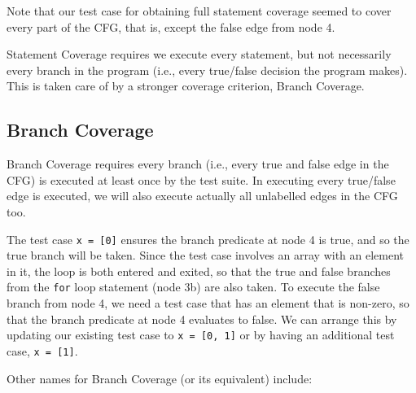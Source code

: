 
Note that our test case for obtaining full statement coverage seemed to cover
every part of the CFG, that is, except the false edge from node 4. 


Statement Coverage requires we execute every statement, but not necessarily
every branch in the program (i.e., every true/false decision the program makes).
This is taken care of by a stronger coverage criterion, Branch Coverage.


\subsection{Branch Coverage} 

Branch Coverage requires every branch (i.e., every true and false edge in the
CFG) is executed at least once by the test suite. In executing every true/false
edge is executed, we will also execute actually all unlabelled edges in the CFG
too.

The test case {\tt x = [0]} ensures the branch predicate at node 4 is true, and
so the true branch will be taken. Since the test case involves an array with an
element in it, the loop is both entered and exited, so that the true and false
branches from the {\tt for} loop statement (node 3b) are also taken. To execute
the false branch from node 4, we need a test case that has an element that is
non-zero, so that the branch predicate at node 4 evaluates to false. We can
arrange this by updating our existing test case to {\tt x = [0, 1]} or by having
an additional test case, {\tt x = [1]}.


Other names for Branch Coverage (or its equivalent) include:


